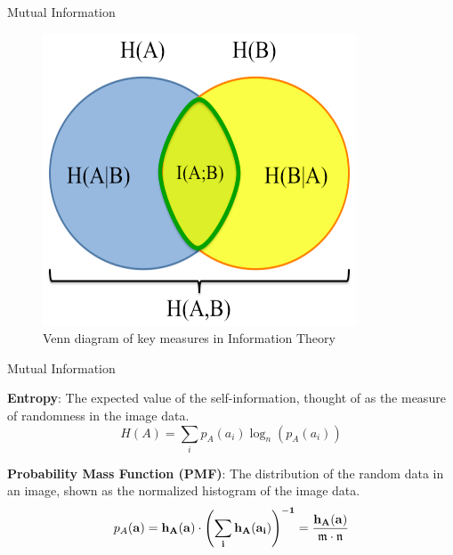 \documentclass{beamer}
\begin{document}
\begin{frame}[c]{\sc Mutual Information}

\begin{figure}
\centering
\includegraphics[height=.7\textheight]{informationTheory}
\caption{Venn diagram of key measures in Information Theory}
\label{infoTheory}
\end{figure}


\end{frame}


\begin{frame}[c]{\sc Mutual Information}

\textbf{Entropy}: The expected value of the self-information, thought of as the measure of randomness in the image data.
\begin{equation}
\label{entropy}
	H(A) = \sum_{i}{p_{A}(a_{i}) \log_{n}{\left(p_{A}(a_{i})\right)}}
\end{equation}

\vfill

\textbf{Probability Mass Function (PMF)}: The distribution of the random data in an image, shown as the normalized histogram of the image data.
\begin{equation}
\label{PMF}
	p_{A}(\bf{a})=h_{A}(\bf{a}) \cdot \left(\sum_{i}{h_{A}(a_{i})} \right)^{-1} = \frac{h_{A}(\bf{a})}{\mathfrak{m}\cdot\mathfrak{n}}
\end{equation}


\end{frame}
\end{document}
